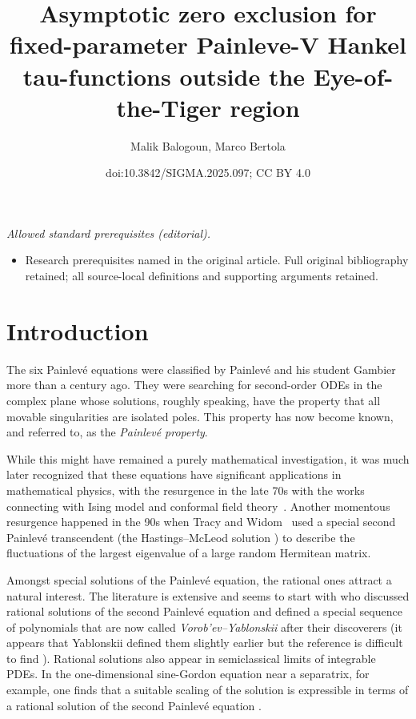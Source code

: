 \documentclass[10pt,a4paper]{amsart}
\title{Asymptotic zero exclusion for fixed-parameter Painleve-V Hankel tau-functions outside the Eye-of-the-Tiger region}
\author{Malik Balogoun, Marco Bertola}
\date{doi:10.3842/SIGMA.2025.097; CC BY 4.0}
\numberwithin{equation}{section}
\theoremstyle{definition}
\begin{document}
\maketitle
\noindent\textit{Allowed standard prerequisites (editorial).}\begin{itemize}
\item Research prerequisites named in the original article. Full original bibliography retained; all source-local definitions and supporting arguments retained.
\end{itemize}\medskip
\section{Introduction}\vspace{-1mm}

The six Painlev\'e equations were classified by Painlev\'e and his student Gambier \cite{Gambier,Painleve} more than a century ago. They were searching for second-order ODEs in the complex plane whose solutions, roughly speaking, have the property that all movable singularities are isolated poles. This property has now become known, and referred to, as the {\it Painlev\'e property}.

While this might have remained a purely mathematical investigation, it was much later recognized that these equations have significant applications in mathematical physics, with the resurgence in the late 70s with the works connecting with Ising model and conformal field theory~\cite{McCoyTracyWu1, McCoyTracyWu2}. Another momentous resurgence happened in the 90s when Tracy and Widom~\cite{TracyWidom94} used a special second Painlev\'e transcendent (the Hastings--McLeod solution \cite{HasMc}) to describe the fluctuations of the largest eigenvalue of a large random Hermitean matrix.

Amongst special solutions of the Painlev\'e equation, the rational ones attract a natural interest. The literature is extensive and seems to start with \cite{Vorobev} who discussed rational solutions of the second Painlev\'e equation and defined a special sequence of polynomials that are now called {\it Vorob'ev--Yablonskii} after their discoverers (it appears that Yablonskii defined them slightly earlier but the reference is difficult to find \cite{Yablonskii}).
Rational solutions also appear in semiclassical limits of integrable PDEs. In the one-dimensional sine-Gordon equation near a separatrix, for example, one finds that a suitable scaling of the solution is expressible in terms of a rational solution of the second Painlev\'e equation \cite{BuckMill12}.
\end{document}
